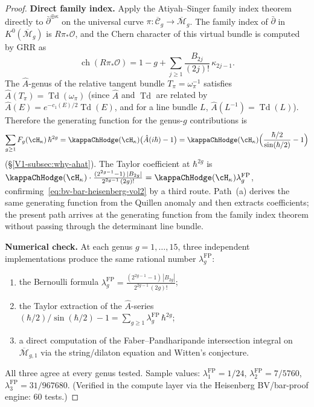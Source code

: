 \begin{proof}
\medskip
\noindent\textbf{Direct family index.}
Apply the Atiyah--Singer family index theorem
directly to $\bar\partial^{\oplus\kappa}$
on the universal curve $\pi \colon \overline{\mathcal{C}}_g
\to \overline{\mathcal{M}}_g$.
The family index of $\bar\partial$ in
$K^0(\overline{\mathcal{M}}_g)$ is $R\pi_*\mathcal{O}$,
and the Chern character of this virtual bundle is computed by GRR as
\[
\operatorname{ch}(R\pi_*\mathcal{O})
= 1 - g + \sum_{j \geq 1}
\frac{B_{2j}}{(2j)!}\,\kappa_{2j-1}.
\]
The $\hat{A}$-genus of the relative tangent bundle
$T_\pi = \omega_\pi^{-1}$ satisfies
$\hat{A}(T_\pi) = \operatorname{Td}(\omega_\pi)$
(since $\hat{A}$ and $\operatorname{Td}$ are related by
$\hat{A}(E) = e^{-c_1(E)/2}\operatorname{Td}(E)$, and for
a line bundle $L$,
$\hat{A}(L^{-1}) = \operatorname{Td}(L)$).
Therefore the generating function for the genus-$g$ contributions is
\[
\sum_{g \geq 1} F_g(\cH_\kappa)\,\hbar^{2g}
= \kappaChHodge(\cH_\kappa)\bigl(\hat{A}(i\hbar) - 1\bigr)
= \kappaChHodge(\cH_\kappa)
\Bigl(\frac{\hbar/2}{\sin(\hbar/2)} - 1\Bigr)
\]
\textup{(}\S\ref{V1-subsec:why-ahat}\textup{)}.
The Taylor coefficient at $\hbar^{2g}$ is
$\kappaChHodge(\cH_\kappa) \cdot
\frac{(2^{2g-1}-1)\,|B_{2g}|}{2^{2g-1}\,(2g)!}
= \kappaChHodge(\cH_\kappa)\lambda_g^{\mathrm{FP}}$,
confirming~\eqref{eq:bv-bar-heisenberg-vol2} by a third route.
Path~\textup{(a)} derives the same generating function
from the Quillen anomaly and then extracts coefficients; the present
path arrives at the generating function from the family index theorem
without passing through the determinant line bundle.

\medskip
\noindent\textbf{Numerical check.}
At each genus $g = 1, \ldots, 15$, three independent
implementations produce the same rational number $\lambda_g^{\mathrm{FP}}$:
\begin{enumerate}[label=\textup{(\roman*)},nosep]
\item the Bernoulli formula
 $\lambda_g^{\mathrm{FP}}
 = \frac{(2^{2g-1}-1)\,|B_{2g}|}{2^{2g-1}\,(2g)!}$;
\item the Taylor extraction of the $\hat{A}$-series
 $(\hbar/2)/\sin(\hbar/2) - 1
 = \sum_{g \geq 1} \lambda_g^{\mathrm{FP}}\,\hbar^{2g}$;
\item a direct computation of the Faber--Pandharipande
 intersection integral on $\overline{\mathcal{M}}_{g,1}$
 via the string/dilaton equation and Witten's conjecture.
\end{enumerate}
All three agree at every genus tested. Sample values:
$\lambda_1^{\mathrm{FP}} = 1/24$,
$\lambda_2^{\mathrm{FP}} = 7/5760$,
$\lambda_3^{\mathrm{FP}} = 31/967680$.
\textup{(}Verified in the compute layer via the Heisenberg
BV/bar-proof engine: $60$ tests.\textup{)}
\end{proof}

